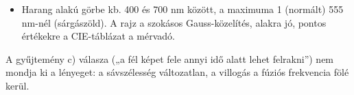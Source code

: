 \begin{rajz}
\begin{center}
\begin{tikzpicture}[x=0.01985cm,y=-0.01985cm,line cap=round,line join=round]
\end{tikzpicture}\end{center}
\begin{itemize}
\item Harang alakú görbe kb. 400 és 700 nm között, a maximuma 1 (normált) 555 nm-nél (sárgászöld). A rajz a szokásos Gauss-közelítés, alakra jó, pontos értékekre a CIE-táblázat a mérvadó.
\end{itemize}
\end{rajz}
\begin{figyelem}[Javítás]
A gyűjtemény c) válasza („a fél képet fele annyi idő alatt lehet felrakni”) nem mondja ki a lényeget: a sávszélesség változatlan, a villogás a fúziós frekvencia fölé kerül.
\end{figyelem}
\begin{eredmeny}

\begin{center}\end{center}
\end{eredmeny}
